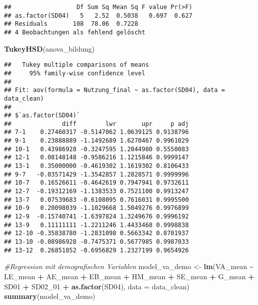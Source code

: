\documentclass[
]{article}
\newenvironment{Shaded}{\begin{snugshade}}{\end{snugshade}}
\newcommand{\AttributeTok}[1]{\textcolor[rgb]{0.13,0.29,0.53}{#1}}
\newcommand{\CommentTok}[1]{\textcolor[rgb]{0.56,0.35,0.01}{\textit{#1}}}
\newcommand{\FunctionTok}[1]{\textcolor[rgb]{0.13,0.29,0.53}{\textbf{#1}}}
\newcommand{\NormalTok}[1]{#1}
\newcommand{\OtherTok}[1]{\textcolor[rgb]{0.56,0.35,0.01}{#1}}
\newcommand{\SpecialCharTok}[1]{\textcolor[rgb]{0.81,0.36,0.00}{\textbf{#1}}}
\begin{document}
\begin{verbatim}
##                  Df Sum Sq Mean Sq F value Pr(>F)
## as.factor(SD04)   5   2.52  0.5038   0.697  0.627
## Residuals       108  78.06  0.7228               
## 4 Beobachtungen als fehlend gelöscht
\end{verbatim}

\begin{Shaded}
\begin{Highlighting}[]
\FunctionTok{TukeyHSD}\NormalTok{(anova\_bildung)}
\end{Highlighting}
\end{Shaded}

\begin{verbatim}
##   Tukey multiple comparisons of means
##     95% family-wise confidence level
## 
## Fit: aov(formula = Nutzung_final ~ as.factor(SD04), data = data_clean)
## 
## $`as.factor(SD04)`
##              diff        lwr       upr     p adj
## 7-1    0.27460317 -0.5147062 1.0639125 0.9138796
## 9-1    0.23888889 -1.1492689 1.6270467 0.9961029
## 10-1   0.43986928 -0.3247595 1.2044980 0.5550083
## 12-1   0.08148148 -0.9586216 1.1215846 0.9999147
## 13-1   0.35000000 -0.4619302 1.1619302 0.8106433
## 9-7   -0.03571429 -1.3542857 1.2828571 0.9999996
## 10-7   0.16526611 -0.4642619 0.7947941 0.9732611
## 12-7  -0.19312169 -1.1383533 0.7521100 0.9913247
## 13-7   0.07539683 -0.6108095 0.7616031 0.9995500
## 10-9   0.20098039 -1.1029668 1.5049276 0.9976899
## 12-9  -0.15740741 -1.6397824 1.3249676 0.9996192
## 13-9   0.11111111 -1.2211246 1.4433468 0.9998838
## 12-10 -0.35838780 -1.2831098 0.5663342 0.8701937
## 13-10 -0.08986928 -0.7475371 0.5677985 0.9987033
## 13-12  0.26851852 -0.6956829 1.2327199 0.9654926
\end{verbatim}

\begin{Shaded}
\begin{Highlighting}[]
\CommentTok{\#Regression mit demografischen Variablen}
\NormalTok{model\_va\_demo }\OtherTok{\textless{}{-}} \FunctionTok{lm}\NormalTok{(VA\_mean }\SpecialCharTok{\textasciitilde{}}\NormalTok{ LE\_mean }\SpecialCharTok{+}\NormalTok{ AE\_mean }\SpecialCharTok{+}\NormalTok{ EB\_mean }\SpecialCharTok{+}\NormalTok{ HM\_mean }\SpecialCharTok{+}\NormalTok{ SE\_mean }\SpecialCharTok{+}\NormalTok{ G\_mean }\SpecialCharTok{+}
\NormalTok{                    SD01 }\SpecialCharTok{+}\NormalTok{ SD02\_01 }\SpecialCharTok{+} \FunctionTok{as.factor}\NormalTok{(SD04), }\AttributeTok{data =}\NormalTok{ data\_clean)}
\FunctionTok{summary}\NormalTok{(model\_va\_demo)}
\end{Highlighting}
\end{Shaded}
\end{document}
